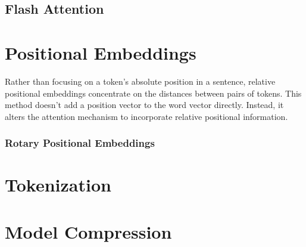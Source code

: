 
\section{Flash Attention}
\label{sec:transformer:flash_attention}

\chapter{Positional Embeddings}
\label{ch:transformer:posemb}

Rather than focusing on a token's absolute position in a sentence, relative positional embeddings concentrate on the distances between pairs of tokens. This method doesn't add a position vector to the word vector directly. Instead, it alters the attention mechanism to incorporate relative positional information.

\subsection{Rotary Positional Embeddings}

\chapter{Tokenization}
\label{ch:transformer:tokenization}

\chapter{Model Compression}
\label{ch:transformer:compression}


